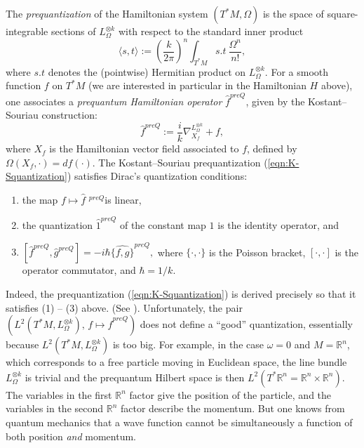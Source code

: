 \documentclass[12pt,leqno]{amsart}%
\theoremstyle{definition}
\theoremstyle{remark}
\numberwithin{equation}{section}
\begin{document}
The \emph{prequantization} of the Hamiltonian system $(T^{\ast}M,\Omega)$ is the
space of square-integrable sections of
$L_{\Omega}^{\otimes k}$
with respect to the standard inner product
\[
\langle s,t\rangle:=\left(  \frac{k}{2\pi}\right)
^{n}\int_{T^{\ast}M}s.t~\frac{\Omega^{n}}{n!},
\]
where $s.t$ denotes the (pointwise) Hermitian product on $L_{\Omega}^{\otimes
k}.$  For a smooth function $f$ on $T^*M$ (we are interested in particular in
the Hamiltonian $H$ above), one associates a \emph{prequantum Hamiltonian
operator} $\widehat{f}^{preQ}$, given by the Kostant--Souriau construction:
\begin{equation}
\widehat{f}^{preQ}:=\frac{i}{k}\nabla_{X_{f}}^{L_{\Omega}^{\otimes k}
}+f,\label{eqn:K-Squantization}
\end{equation}
where $X_{f}$ is the Hamiltonian vector field associated to $f$, defined by
$\Omega(X_{f},\cdot)=df(\cdot)$. The Kostant--Souriau prequantization
(\ref{eqn:K-Squantization}) satisfies Dirac's quantization conditions:
\begin{enumerate}
\item the map $f\mapsto\widehat{f}$ $^{preQ}$is linear,
\item the quantization $\widehat{1}^{preQ}$ of the constant map $1$ is the identity
operator, and
\item $[\widehat{f}^{preQ},\widehat{g}^{preQ}]=-i\hbar\widehat{\{f,g\}}^{preQ},$ where
$\{\cdot,\cdot\}$ is the Poisson bracket, $[\cdot,\cdot]$ is the operator
commutator, and $\hbar=1/k$.
\end{enumerate}
Indeed, the prequantization (\ref{eqn:K-Squantization}) is derived precisely so
that it satisfies (1) -- (3) above. (See \cite[Chap. 8]{Woo}). Unfortunately,
the
pair $(L^{2}(T^{\ast}M,L_{\Omega}^{\otimes k}),\,f\mapsto\widehat{f}^{preQ})$ does
not define a ``good'' quantization, essentially because
$L^{2}(T^{\ast}M,L_{\Omega}^{\otimes k})$ is too big. For example, in the case
$\omega=0$ and $M=\mathbb{R}^{n}$, which corresponds to a free particle moving
in Euclidean space, the line bundle $L_{\Omega}^{\otimes k}$ is trivial and the
prequantum Hilbert space is then
$L^{2}(T^{\ast}\mathbb{R}^{n}=\mathbb{R}^{n}\times\mathbb{R}^{n}).$ The
variables in the first $\mathbb{R}^{n}$ factor give the position of the
particle, and the variables in the second $\mathbb{R}^{n}$ factor describe the
momentum. But one knows from quantum mechanics that a wave function cannot be
simultaneously a function of both position \emph{and} momentum.
\end{document}
